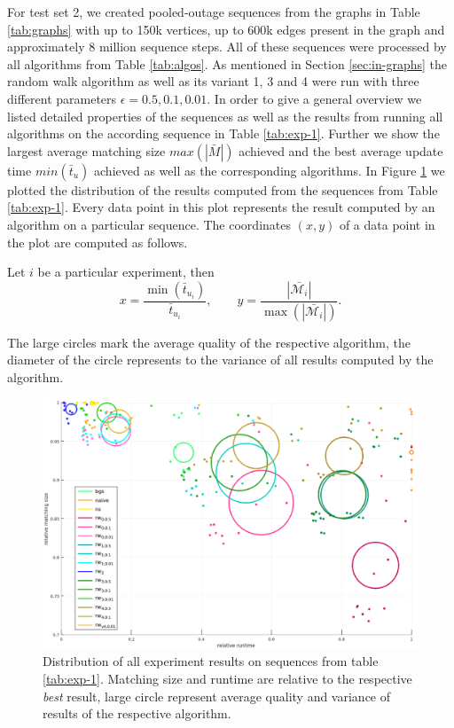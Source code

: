 \documentclass{article}      %
\begin{document}
For test set 2, we created pooled-outage sequences from the graphs in Table \ref{tab:graphs} with up to 150k vertices, up to 600k edges present in the graph and approximately 8 million sequence steps. All of these sequences were processed by all algorithms from Table \ref{tab:algos}. As mentioned in Section \ref{sec:in-graphs} the random walk algorithm as well as its variant 1, 3 and 4 were run with three different parameters $\epsilon=0.5,0.1,0.01$. In order to give a general overview we listed detailed properties of the sequences as well as the results from running all algorithms on the according sequence in Table \ref{tab:exp-1}. Further we show the largest average matching size $max(|\bar{M}|)$ achieved and the best average update time $min(\bar{t}_u)$ achieved as well as the corresponding algorithms. In Figure \ref{fig:scatter-150-600} we plotted the distribution of the results computed from the sequences from Table \ref{tab:exp-1}. Every data point in this plot represents the result computed by an algorithm on a particular sequence. 
The coordinates $(x,y)$ of a data point in the plot are computed as follows.

Let $i$ be a particular experiment, then
$$
	x = \frac{\min(\bar{t}_{u_i})}{\bar{t}_{u_i}} ,
	\quad\quad
	y = \frac{|\bar{\mathcal{M}_i}|}{\max(|\bar{\mathcal{M}_i}|)} .
$$

The large circles mark the average quality of the respective algorithm, the diameter of the circle represents to the variance of all results computed by the algorithm.

\begin{figure}
	\centering
	\includegraphics[width=\textwidth]{img/exp_150k_600k_scatter.png}
	\caption{Distribution of all experiment results on sequences from table \ref{tab:exp-1}. Matching size and runtime are relative to the respective \emph{best} result, large circle represent average quality and variance of results of the respective algorithm.
	}
	\label{fig:scatter-150-600}
\end{figure}
\end{document}
